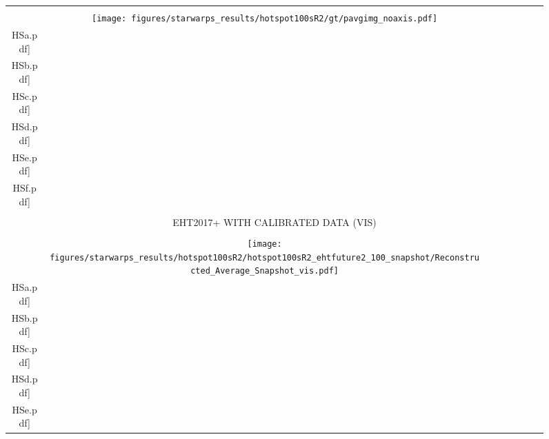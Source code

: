 \begin{figure}
\begin{center}
\begin{tabular}{  c | c | c  c  c  c  c c }
			&\vspace{-.1in} &&&&&&\\
			\multirow{1}{*}[.5in]{ \rotatebox[origin=t]{90}{\large{\textsf{Truth}} }}
			&
			{{\texttt{[image: figures/starwarps\_results/hotspot100sR2/gt/pavgimg\_noaxis.pdf]}} } &
			\texttt{[image: figures/starwarps\_results/hotspot100sR2/gt/frames/gt\_noaxis\_\\HSa.pdf]} &
			\texttt{[image: figures/starwarps\_results/hotspot100sR2/gt/frames/gt\_noaxis\_\\HSb.pdf]} &
			\texttt{[image: figures/starwarps\_results/hotspot100sR2/gt/frames/gt\_noaxis\_\\HSc.pdf]} &
			\texttt{[image: figures/starwarps\_results/hotspot100sR2/gt/frames/gt\_noaxis\_\\HSd.pdf]} &
			\texttt{[image: figures/starwarps\_results/hotspot100sR2/gt/frames/gt\_noaxis\_\\HSe.pdf]} &
			\texttt{[image: figures/starwarps\_results/hotspot100sR2/gt/frames/gt\_noaxis\_\\HSf.pdf]} 
			\\   \hline
			&\vspace{-.1in} &&&&&&\\
			\multicolumn{8}{c}{  \large{\textsf{EHT2017+ WITH CALIBRATED DATA (VIS) }}  }
			\\ \hline
			&\vspace{-.1in} &&&&&&\\
			\multirow{1}{*}[.5in]{ \rotatebox[origin=t]{90}{\small{\textsf{Snapshot}} }}
			&
			{{\texttt{[image: figures/starwarps\_results/hotspot100sR2/hotspot100sR2\_ehtfuture2\_100\_snapshot/Reconstructed\_Average\_Snapshot\_vis.pdf]}} } &
			\texttt{[image: figures/starwarps\_results/hotspot100sR2/hotspot100sR2\_ehtfuture2\_100\_snapshot/Reconstructed\_Snapshot\_vis\_\\HSa.pdf]} &
			\texttt{[image: figures/starwarps\_results/hotspot100sR2/hotspot100sR2\_ehtfuture2\_100\_snapshot/Reconstructed\_Snapshot\_vis\_\\HSb.pdf]} &
			\texttt{[image: figures/starwarps\_results/hotspot100sR2/hotspot100sR2\_ehtfuture2\_100\_snapshot/Reconstructed\_Snapshot\_vis\_\\HSc.pdf]} &
			\texttt{[image: figures/starwarps\_results/hotspot100sR2/hotspot100sR2\_ehtfuture2\_100\_snapshot/Reconstructed\_Snapshot\_vis\_\\HSd.pdf]} &
			\texttt{[image: figures/starwarps\_results/hotspot100sR2/hotspot100sR2\_ehtfuture2\_100\_snapshot/Reconstructed\_Snapshot\_vis\_\\HSe.pdf]} &

\end{tabular}
\end{center}
\end{figure}

